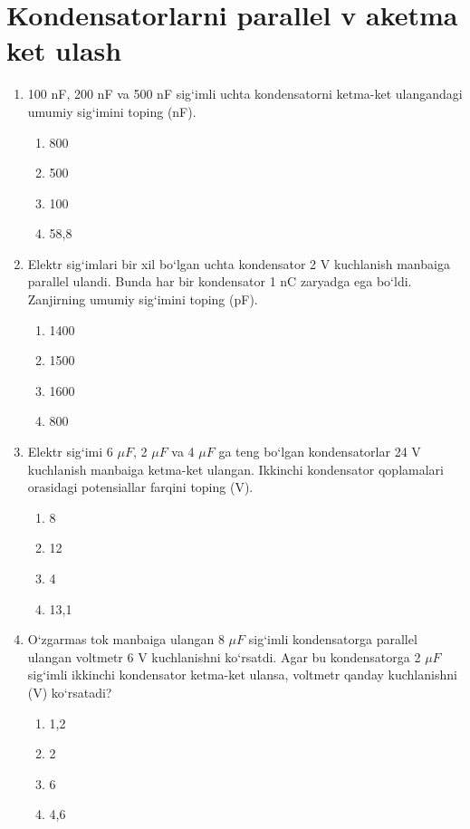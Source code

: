 \section{Kondensatorlarni parallel v aketma ket ulash}


\begin{enumerate}

\item 100 nF, 200 nF va 500 nF sig‘imli uchta kondensatorni ketma-ket ulangandagi umumiy sig‘imini toping (nF).
\begin{enumerate}[label=\Alph*)]
\item 800
\item 500
\item 100
\item 58,8
\end{enumerate}

\item Elektr sig‘imlari bir xil bo‘lgan uchta kondensator 2 V kuchlanish manbaiga parallel ulandi. Bunda har bir kondensator 1 nC zaryadga ega bo‘ldi. Zanjirning umumiy sig‘imini toping (pF).
\begin{enumerate}[label=\Alph*)]
\item 1400
\item 1500
\item 1600
\item 800
\end{enumerate}

\item Elektr sig‘imi 6 $\mu F$, 2 $\mu F$ va 4 $\mu F$ ga teng bo‘lgan kondensatorlar 24 V kuchlanish manbaiga ketma-ket ulangan. Ikkinchi kondensator qoplamalari orasidagi potensiallar farqini toping (V).
\begin{enumerate}[label=\Alph*)]
\item 8
\item 12
\item 4
\item 13,1
\end{enumerate}

\item O‘zgarmas tok manbaiga ulangan 8 $\mu F$ sig‘imli kondensatorga parallel ulangan voltmetr 6 V kuchlanishni ko‘rsatdi. Agar bu kondensatorga 2 $\mu F$ sig‘imli ikkinchi kondensator ketma-ket ulansa, voltmetr qanday kuchlanishni (V) ko‘rsatadi?
\begin{enumerate}[label=\Alph*)]
\item 1,2
\item 2
\item 6
\item 4,6
\end{enumerate}


\end{enumerate}
